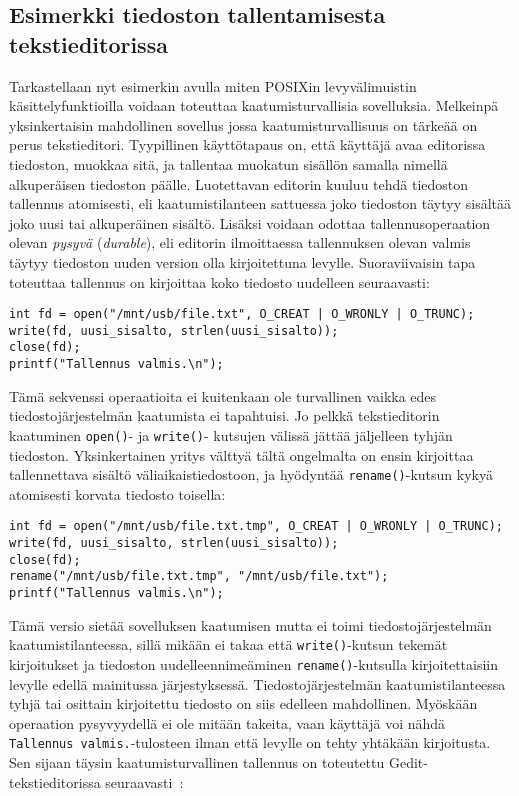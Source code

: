 \subsection{Esimerkki tiedoston tallentamisesta tekstieditorissa}
Tarkastellaan nyt esimerkin avulla miten POSIXin levyvälimuistin käsittelyfunktioilla voidaan toteuttaa kaatumisturvallisia sovelluksia.
Melkeinpä yksinkertaisin mahdollinen sovellus jossa kaatumisturvallisuus on tärkeää on perus tekstieditori.
Tyypillinen käyttötapaus on, että käyttäjä avaa editorissa tiedoston, muokkaa sitä, ja tallentaa muokatun sisällön samalla nimellä alkuperäisen tiedoston päälle.
Luotettavan editorin kuuluu tehdä tiedoston tallennus atomisesti,
eli kaatumistilanteen sattuessa joko tiedoston täytyy sisältää joko uusi tai alkuperäinen sisältö.
Lisäksi voidaan odottaa tallennusoperaation olevan \emph{pysyvä} (\emph{durable}),
eli editorin ilmoittaessa tallennuksen olevan valmis täytyy tiedoston uuden version olla kirjoitettuna levylle.
Suoraviivaisin tapa toteuttaa tallennus on kirjoittaa koko tiedosto uudelleen seuraavasti:

\begin{verbatim}
int fd = open("/mnt/usb/file.txt", O_CREAT | O_WRONLY | O_TRUNC);
write(fd, uusi_sisalto, strlen(uusi_sisalto));
close(fd);
printf("Tallennus valmis.\n");
\end{verbatim}
%
Tämä sekvenssi operaatioita ei kuitenkaan ole turvallinen vaikka edes tiedostojärjestelmän kaatumista ei tapahtuisi.
Jo pelkkä tekstieditorin kaatuminen \texttt{open()}- ja \texttt{write()}- kutsujen välissä jättää jäljelleen tyhjän tiedoston.
Yksinkertainen yritys välttyä tältä ongelmalta on ensin kirjoittaa tallennettava sisältö väliaikaistiedostoon,
ja hyödyntää \texttt{rename()}-kutsun kykyä atomisesti korvata tiedosto toisella:

\begin{verbatim}
int fd = open("/mnt/usb/file.txt.tmp", O_CREAT | O_WRONLY | O_TRUNC);
write(fd, uusi_sisalto, strlen(uusi_sisalto));
close(fd);
rename("/mnt/usb/file.txt.tmp", "/mnt/usb/file.txt");
printf("Tallennus valmis.\n");
\end{verbatim}
%
Tämä versio sietää sovelluksen kaatumisen mutta ei toimi tiedostojärjestelmän kaatumistilanteessa,
sillä mikään ei takaa että \texttt{write()}-kutsun tekemät kirjoitukset ja tiedoston uudelleennimeäminen \texttt{rename()}-kutsulla kirjoitettaisiin levylle edellä mainitussa järjestyksessä.
Tiedostojärjestelmän kaatumistilanteessa tyhjä tai osittain kirjoitettu tiedosto on siis edelleen mahdollinen.
Myöskään operaation pysyvyydellä ei ole mitään takeita,
vaan käyttäjä voi nähdä \texttt{Tallennus valmis.}-tulosteen ilman että levylle on tehty yhtäkään kirjoitusta.
Sen sijaan täysin kaatumisturvallinen tallennus on toteutettu Gedit-tekstieditorissa seuraavasti~\cite{OptimisticCrashConsistency}:

